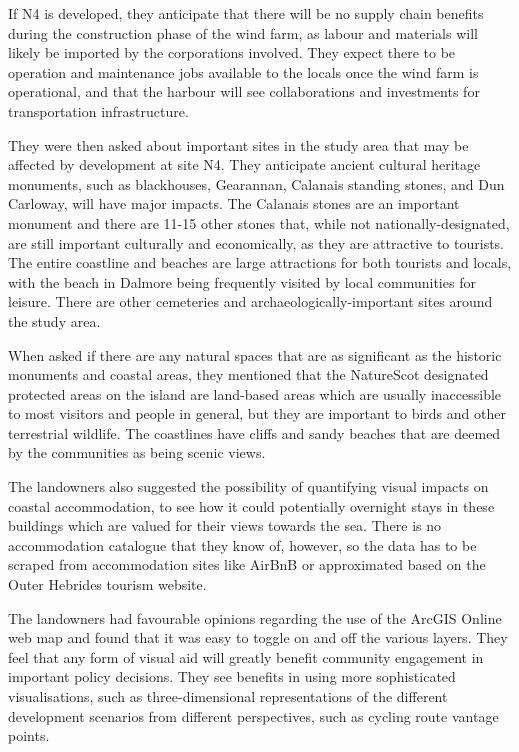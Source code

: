 If N4 is developed, they anticipate that there will be no supply chain benefits during the construction phase of the wind farm, as labour and materials will likely be imported by the corporations involved. They expect there to be operation and maintenance jobs available to the locals once the wind farm is operational, and that the harbour will see collaborations and investments for transportation infrastructure.

They were then asked about important sites in the study area that may be affected by development at site N4. They anticipate ancient cultural heritage monuments, such as blackhouses, Gearannan, Calanais standing stones, and Dun Carloway, will have major impacts. The Calanais stones are an important monument and there are 11-15 other stones that, while not nationally-designated, are still important culturally and economically, as they are attractive to tourists. The entire coastline and beaches are large attractions for both tourists and locals, with the beach in Dalmore being frequently visited by local communities for leisure. There are other cemeteries and archaeologically-important sites around the study area.

When asked if there are any natural spaces that are as significant as the historic monuments and coastal areas, they mentioned that the NatureScot designated protected areas on the island are land-based areas which are usually inaccessible to most visitors and people in general, but they are important to birds and other terrestrial wildlife. The coastlines have cliffs and sandy beaches that are deemed by the communities as being scenic views.

The landowners also suggested the possibility of quantifying visual impacts on coastal accommodation, to see how it could potentially overnight stays in these buildings which are valued for their views towards the sea. There is no accommodation catalogue that they know of, however, so the data has to be scraped from accommodation sites like AirBnB or approximated based on the Outer Hebrides tourism website.

The landowners had favourable opinions regarding the use of the ArcGIS Online web map and found that it was easy to toggle on and off the various layers. They feel that any form of visual aid will greatly benefit community engagement in important policy decisions. They see benefits in using more sophisticated visualisations, such as three-dimensional representations of the different development scenarios from different perspectives, such as cycling route vantage points.

